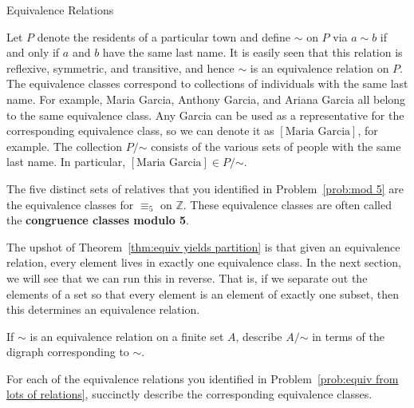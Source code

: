 \begin{section}{Equivalence Relations}
\begin{example}\label{ex:last name}
Let $P$ denote the residents of a particular town and define $\sim$ on $P$ via $a\sim b$ if and only if $a$ and $b$ have the same last name. It is easily seen that this relation is reflexive, symmetric, and transitive, and hence $\sim$ is an equivalence relation on $P$.  The equivalence classes correspond to collections of individuals with the same last name.  For example, Maria Garcia, Anthony Garcia, and Ariana Garcia all belong to the same equivalence class.  Any Garcia can be used as a representative for the corresponding equivalence class, so we can denote it as $[\text{Maria Garcia}]$, for example. The collection $P/\mathord\sim$ consists of the various sets of people with the same last name.  In particular, $[\text{Maria Garcia}]\in P/\mathord\sim$.
\end{example}

\begin{example}
The five distinct sets of relatives that you identified in Problem~\ref{prob:mod 5} are the equivalence classes for $\equiv_5$ on $\mathbb{Z}$. These equivalence classes are often called the \textbf{congruence classes modulo 5}.
\end{example}

The upshot of Theorem~\ref{thm:equiv yields partition} is that given an equivalence relation, every element lives in exactly one equivalence class.  In the next section, we will see that we can run this in reverse.  That is, if we separate out the elements of a set so that every element is an element of exactly one subset, then this determines an equivalence relation.

\begin{problem}
If $\sim$ is an equivalence relation on a finite set $A$, describe $A/\mathord\sim$ in terms of the digraph corresponding to $\sim$.
\end{problem}

\begin{problem}
For each of the equivalence relations you identified in Problem~\ref{prob:equiv from lots of relations}, succinctly describe the corresponding equivalence classes.
\end{problem}

\end{section}